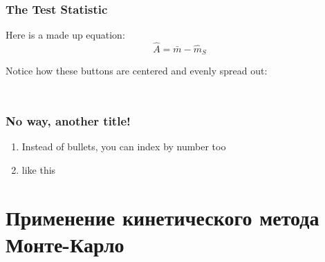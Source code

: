 \documentclass[
    11pt, %
    aspectratio=169, %
]{beamer}
\begin{document}
\begin{frame}
\label{Test Stat}
	\frametitle{The Test Statistic}
		
        Here is a made up equation:
        $$ \hat{A} = \bar{m}-\hat{m}_S$$ \newline

        Notice how these buttons are centered and evenly spread out:\newline

        \begin{columns}[t] %
		\begin{column}{0.25\textwidth} %
                \hyperlink{Terms}{}
		\end{column}
  		\begin{column}{0.25\textwidth} %
                \hyperlink{Definitions}{}
		\end{column}
            \begin{column}{0.25\textwidth} %
                \hyperlink{Theorems}{}
		\end{column}
	\end{columns}
        
\end{frame}

\begin{frame}
	\frametitle{No way, another title!}
            \begin{enumerate}
                \item Instead of bullets, you can index by number too\newline
                \item like this
            \end{enumerate}
\end{frame}

\section{Применение кинетического метода Монте-Карло}
\end{document}
